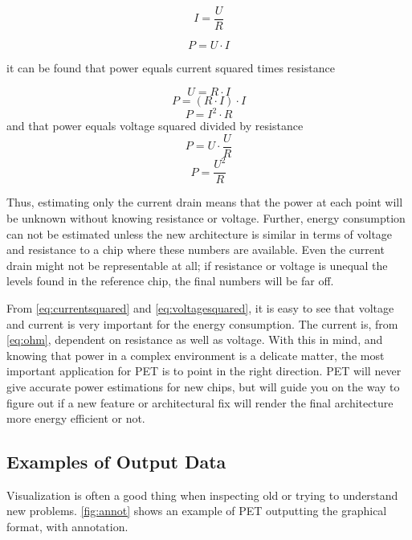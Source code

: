 \begin{equation}
I=\frac{U}{R}
\label{eq:ohm}
\end{equation}

\begin{equation}
P=U \cdot I
\label{eq:power}
\end{equation}

it can be found that power equals current squared times resistance

\[U=R \cdot I\]
\[P=(R \cdot I) \cdot I\]
\begin{equation}
P=I^2 \cdot R
\label{eq:currentsquared}
\end{equation}
and that power equals voltage squared divided by resistance
\[P=U \cdot \frac{U}{R}\]
\begin{equation}
P=\frac{U^2}{R}
\label{eq:voltagesquared}
\end{equation}

Thus, estimating only the current drain means that the power at each point will
be unknown without knowing resistance or voltage. Further, energy consumption
can not be estimated unless the new architecture is similar in terms of voltage
and resistance to a chip where these numbers are available. Even the current
drain might not be representable at all; if resistance or voltage is unequal
the levels found in the reference chip, the final numbers will be far off.

From \autoref{eq:currentsquared} and \autoref{eq:voltagesquared}, it is easy to
see that voltage and current is very important for the energy consumption. The
current is, from \autoref{eq:ohm}, dependent on resistance as well as voltage.
With this in mind, and knowing that power in a complex environment is a delicate
matter, the most important application for PET is to point in the right
direction. PET will never give accurate power estimations for new chips, but
will guide you on the way to figure out if a new feature or architectural fix
will render the final architecture more energy efficient or not.


\subsection{Examples of Output Data}

Visualization is often a good thing when inspecting old or trying to understand
new problems. \autoref{fig:annot} shows an example of PET outputting the
graphical format, with annotation.

